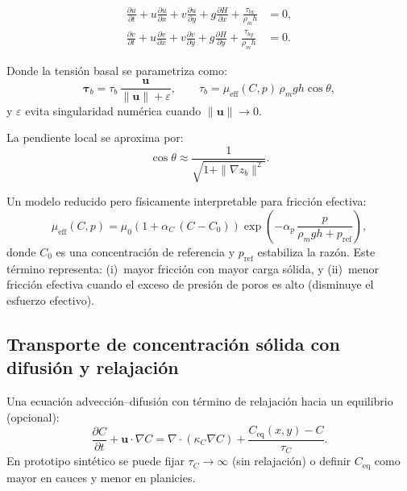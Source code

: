 \begin{align}
  \frac{\partial u}{\partial t} + u\frac{\partial u}{\partial x}
    + v\frac{\partial u}{\partial y} + g\frac{\partial H}{\partial x}
    + \frac{\tau_{bx}}{\rho_m h} &= 0, \label{eq:momento_x} \\
  \frac{\partial v}{\partial t} + u\frac{\partial v}{\partial x}
    + v\frac{\partial v}{\partial y} + g\frac{\partial H}{\partial y}
    + \frac{\tau_{by}}{\rho_m h} &= 0. \label{eq:momento_y}
\end{align}

Donde la tensión basal se parametriza como:
\begin{equation}
  \boldsymbol{\tau}_b = \tau_b\,\frac{\mathbf{u}}{\|\mathbf{u}\| + \varepsilon},
  \qquad
  \tau_b = \mu_{\mathrm{eff}}(C,p)\,\rho_m g h \cos\theta,
  \label{eq:tension_basal}
\end{equation}
y $\varepsilon$ evita singularidad numérica cuando $\|\mathbf{u}\| \to 0$.

La pendiente local se aproxima por:
\begin{equation}
  \cos\theta \approx \frac{1}{\sqrt{1 + \|\nabla z_b\|^2}}.
  \label{eq:cos_theta}
\end{equation}
 
Un modelo reducido pero físicamente interpretable para fricción efectiva:
\begin{equation}
  \mu_{\mathrm{eff}}(C,p) = \mu_0\left(1 + \alpha_C\,(C - C_0)\right)
  \exp\!\left(-\alpha_p\,\frac{p}{\rho_m g h + p_{\mathrm{ref}}}\right),
  \label{eq:mu_eff}
\end{equation}
donde $C_0$ es una concentración de referencia y $p_{\mathrm{ref}}$ estabiliza la
razón. Este término representa: (i)~mayor fricción con mayor carga sólida, y
(ii)~menor fricción efectiva cuando el exceso de presión de poros es alto
(disminuye el esfuerzo efectivo).


\subsection{Transporte de concentración sólida con difusión y relajación}
\label{sec:concentracion}
 
Una ecuación advección--difusión con término de relajación hacia un equilibrio
(opcional):
\begin{equation}
  \frac{\partial C}{\partial t} + \mathbf{u}\cdot\nabla C
  = \nabla\cdot\left(\kappa_C \nabla C\right) + \frac{C_{\mathrm{eq}}(x,y) - C}{\tau_C}.
  \label{eq:concentracion}
\end{equation}
En prototipo sintético se puede fijar $\tau_C \to \infty$ (sin relajación) o
definir $C_{\mathrm{eq}}$ como mayor en cauces y menor en planicies.
 

